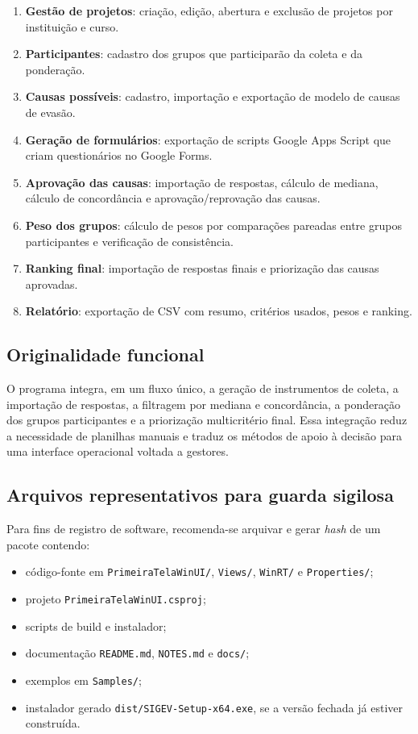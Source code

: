 \begin{enumerate}
  \item \textbf{Gestão de projetos}: criação, edição, abertura e exclusão de projetos por instituição e curso.
  \item \textbf{Participantes}: cadastro dos grupos que participarão da coleta e da ponderação.
  \item \textbf{Causas possíveis}: cadastro, importação e exportação de modelo de causas de evasão.
  \item \textbf{Geração de formulários}: exportação de scripts Google Apps Script que criam questionários no Google Forms.
  \item \textbf{Aprovação das causas}: importação de respostas, cálculo de mediana, cálculo de concordância e aprovação/reprovação das causas.
  \item \textbf{Peso dos grupos}: cálculo de pesos por comparações pareadas entre grupos participantes e verificação de consistência.
  \item \textbf{Ranking final}: importação de respostas finais e priorização das causas aprovadas.
  \item \textbf{Relatório}: exportação de CSV com resumo, critérios usados, pesos e ranking.
\end{enumerate}

\subsection{Originalidade funcional}

O programa integra, em um fluxo único, a geração de instrumentos de coleta, a importação de respostas, a filtragem por mediana e concordância, a ponderação dos grupos participantes e a priorização multicritério final. Essa integração reduz a necessidade de planilhas manuais e traduz os métodos de apoio à decisão para uma interface operacional voltada a gestores.

\subsection{Arquivos representativos para guarda sigilosa}

Para fins de registro de software, recomenda-se arquivar e gerar \textit{hash} de um pacote contendo:

\begin{itemize}
  \item código-fonte em \texttt{PrimeiraTelaWinUI/}, \texttt{Views/}, \texttt{WinRT/} e \texttt{Properties/};
  \item projeto \texttt{PrimeiraTelaWinUI.csproj};
  \item scripts de build e instalador;
  \item documentação \texttt{README.md}, \texttt{NOTES.md} e \texttt{docs/};
  \item exemplos em \texttt{Samples/};
  \item instalador gerado \texttt{dist/SIGEV-Setup-x64.exe}, se a versão fechada já estiver construída.
\end{itemize}

